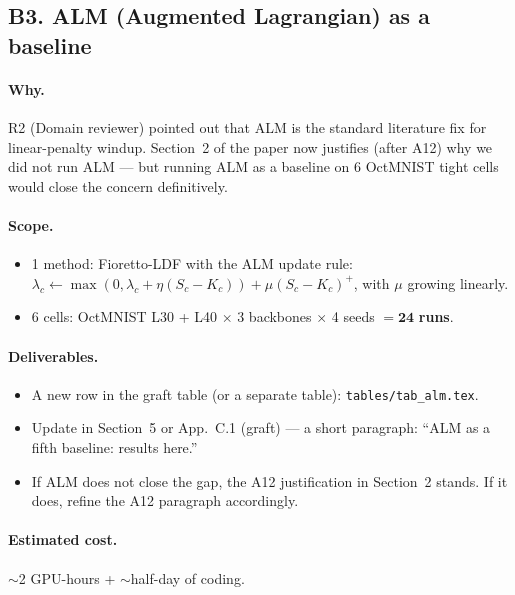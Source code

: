 \documentclass[11pt,a4paper]{article}
\newcommand{\file}[1]{\texttt{#1}}
\begin{document}
\subsection{B3. ALM (Augmented Lagrangian) as a baseline}

\paragraph{Why.} R2 (Domain reviewer) pointed out that ALM is the standard
literature fix for linear-penalty windup. Section~2 of the paper now
justifies (after A12) why we did not run ALM --- but running ALM as a
baseline on 6 OctMNIST tight cells would close the concern definitively.

\paragraph{Scope.}
\begin{itemize}[nosep]
  \item 1 method: Fioretto-LDF with the ALM update rule:
        $\lambda_c \leftarrow \max(0, \lambda_c + \eta(S_c - K_c)) +
        \mu(S_c - K_c)^+$, with $\mu$ growing linearly.
  \item 6 cells: OctMNIST L30 + L40 $\times$ 3 backbones $\times$ 4 seeds
        $= \mathbf{24}$ \textbf{runs}.
\end{itemize}

\paragraph{Deliverables.}
\begin{itemize}[nosep]
  \item A new row in the graft table (or a separate table):
        \file{tables/tab\_alm.tex}.
  \item Update in Section~5 or App.~C.1 (graft) --- a short paragraph:
        ``ALM as a fifth baseline: results here.''
  \item If ALM does not close the gap, the A12 justification in Section~2
        stands. If it does, refine the A12 paragraph accordingly.
\end{itemize}

\paragraph{Estimated cost.} $\sim$2 GPU-hours + $\sim$half-day of coding.

\end{document}
